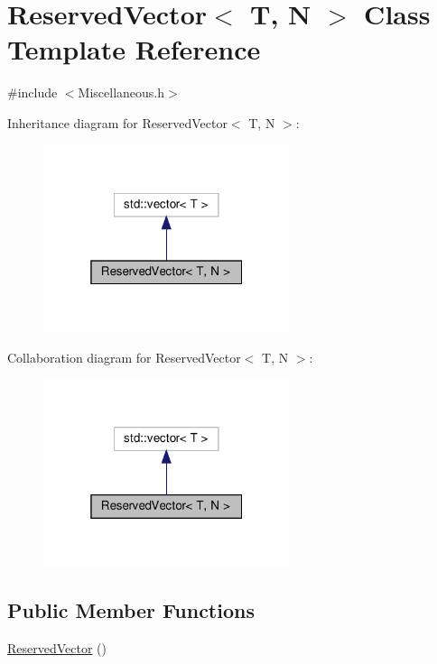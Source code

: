 \hypertarget{class_reserved_vector}{}\section{Reserved\+Vector$<$ T, N $>$ Class Template Reference}
\label{class_reserved_vector}


{\ttfamily \#include $<$Miscellaneous.\+h$>$}



Inheritance diagram for Reserved\+Vector$<$ T, N $>$\+:
\nopagebreak
\begin{figure}[H]
\begin{center}
\leavevmode
\includegraphics[width=205pt]{class_reserved_vector__inherit__graph}
\end{center}
\end{figure}


Collaboration diagram for Reserved\+Vector$<$ T, N $>$\+:
\nopagebreak
\begin{figure}[H]
\begin{center}
\leavevmode
\includegraphics[width=205pt]{class_reserved_vector__coll__graph}
\end{center}
\end{figure}
\subsection*{Public Member Functions}
\begin{DoxyCompactItemize}
\item 
\hyperlink{class_reserved_vector_aa58994583a0d230b8ebc7ae4d9454465}{Reserved\+Vector} ()
\end{DoxyCompactItemize}


